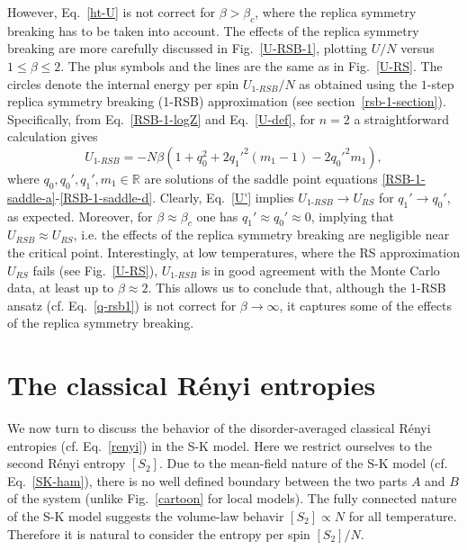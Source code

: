 \documentclass[twocolumn,superscriptaddress,prb,10pt]{revtex4-1}
\begin{document}
However, Eq.~\eqref{ht-U} is not correct for $\beta>\beta_c$, where the replica symmetry breaking 
has to be taken into account. The effects of the replica symmetry breaking are more carefully 
discussed in Fig.~\ref{U-RSB-1}, plotting $U/N$ versus $1\le\beta\le 2$. The plus symbols and the 
lines are the same as in Fig.~\ref{U-RS}. The circles denote the internal energy per spin 
$U_{1\textrm{-}RSB}/N$ as obtained using the $1$-step replica symmetry breaking (1-RSB) 
approximation (see section~\ref{rsb-1-section}). Specifically, from Eq.~\eqref{RSB-1-logZ} 
and Eq.~\eqref{U-def}, for $n=2$ a straightforward calculation gives 
%
\begin{equation}
U_{1\textrm{-}RSB}=-N\beta(1+q_0^2+2q_1'^2(m_1-1)-2q_0'^2m_1), 
\label{U'}
\end{equation}
%
where $q_0,q_0',q_1',m_1\in\mathbb{R}$ are solutions of the saddle point 
equations \eqref{RSB-1-saddle-a}-\eqref{RSB-1-saddle-d}. Clearly, Eq.~\eqref{U'} 
implies $U_{1\textrm{-}RSB}\to U_{RS}$ for $q_1'\to q_0'$, as expected. 
Moreover, for $\beta\approx\beta_c$ one has $q_1'\approx q_0'\approx0$, implying   
that $U_{RSB}\approx U_{RS}$, i.e. the effects of the replica symmetry breaking are 
negligible near the critical point. Interestingly, at low temperatures, where the 
RS approximation $U_{RS}$ fails (see Fig.~\ref{U-RS}), $U_{1\textrm{-}RSB}$ 
is in good agreement with the Monte Carlo data, at least up to $\beta\approx 2$.  
This allows us to conclude that, although the 1-RSB ansatz (cf. Eq.~\eqref{q-rsb1}) 
is not correct for $\beta\to\infty$, it captures some of the effects 
of the replica symmetry breaking.  


\section{The classical R\'enyi entropies}
\label{Renyi-section}

We now turn to discuss the behavior of the disorder-averaged classical R\'enyi entropies 
(cf. Eq.~\eqref{renyi}) in the S-K model. Here we restrict ourselves to the second R\'enyi 
entropy $[S_2]$. Due to the mean-field nature of the S-K model (cf. Eq.~\eqref{SK-ham}), 
there is no well defined boundary between the two parts $A$ and $B$ of the system 
(unlike Fig.~\ref{cartoon} for local models). The fully connected nature of the S-K model 
suggests the volume-law behavir $[S_2]\propto N$ for all temperature.
Therefore it is natural to consider the entropy per spin $[S_2]/N$. 
\end{document}

